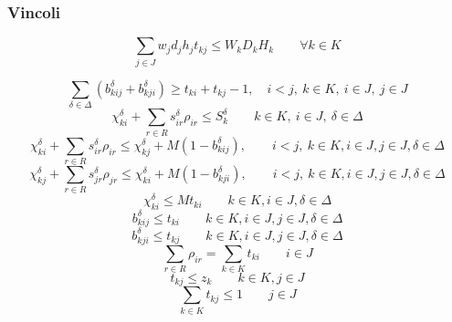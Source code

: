 \documentclass{scrartcl}
\begin{document}
\subsubsection{Vincoli}
\begin{equation}
\label{eq:constraint:volume}
\sum_{j \in J} w_j d_j h_j t_{kj} \leq W_kD_kH_k \quad\quad \forall k \in K 
\end{equation}

\begin{equation}
\sum_{\delta\in\Delta}(b_{kij}^\delta + b_{kji}^\delta) \geq t_{ki} + t_{kj} - 1, \quad i < j,\ k \in K,\ i \in J,\ j \in J
\end{equation}
\begin{equation}
\label{eq:constraint:coodinateLessThanSkdelta}
\chi_{ki}^\delta + \sum_{r \in R} s_{ir}^\delta \rho_{ir} \leq S_k^\delta \quad \quad k \in K,\ i \in J,\ \delta \in \Delta
\end{equation}
\begin{equation}
\chi_{ki}^\delta + \sum_{r \in R} s_{ir}^\delta \rho_{ir} \leq \chi_{kj}^\delta + M(1 - b_{kij}^\delta), \quad \quad i < j,\ k \in K, i \in J, j \in J, \delta \in \Delta
\end{equation}
\begin{equation}
\chi_{kj}^\delta + \sum_{r \in R} s_{jr}^\delta \rho_{jr} \leq \chi_{ki}^\delta + M(1 - b_{kji}^\delta), \quad \quad i < j,\ k \in K, i \in J, j \in J, \delta \in \Delta
\end{equation}
\begin{equation}
\chi_{ki}^\delta \leq M t_{ki}\quad\quad k \in K, i \in J, \delta \in \Delta
\end{equation}
\begin{equation}
b_{kij}^\delta \leq t_{ki}\quad \quad k \in K, i \in J, j \in J, \delta \in \Delta
\end{equation}
\begin{equation}
b_{kji}^\delta \leq t_{kj} \quad \quad k \in K, i \in J, j \in J, \delta \in \Delta
\end{equation}
\begin{equation}
\label{eq:constraint:rho:ir:leq:sumk}
\sum_{r \in R} \rho_{ir} = \sum_{k \in K} t_{ki}\quad \quad i \in J
\end{equation}
\begin{equation}
\label{constraint:multi:tkzk}
t_{kj} \leq z_k\quad \quad k \in K, j \in J
\end{equation}
\begin{equation}
\label{constraint:multi:onlyInOneKnapsack}
\sum_{k \in K} t_{kj} \leq 1 \quad \quad j \in J
\end{equation}
\end{document}
